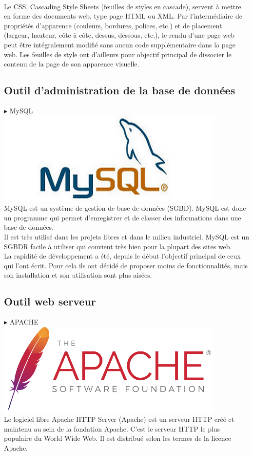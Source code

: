 \documentclass[a4paper, 12pt]{report}
\begin{document}
\\
\noindent Le CSS, Cascading Style Sheets (feuilles de styles en cascade), servent à mettre en forme des documents web, type page HTML ou XML. Par l’intermédiaire de propriétés d’apparence (couleurs, bordures, polices, etc.) et de placement (largeur, hauteur, côte à côte, dessus, dessous, etc.), le rendu d’une page web peut être intégralement modifié sans aucun code supplémentaire dans la page web. Les feuilles de style ont d’ailleurs pour objectif principal de dissocier le contenu de la page de son apparence visuelle.
\subsection{Outil d’administration de la base de données}
\noindent $\blacktriangleright$ MySQL
\\
\includegraphics{img/outils/6}
\\
\noindent MySQL est un système de gestion de base de données (SGBD). MySQL est donc un programme qui permet d'enregistrer et de classer des informations dans une base de données.
\\
Il est très utilisé dans les projets libres et dans le milieu industriel. MySQL est un SGBDR facile à utiliser qui convient très bien pour la plupart des sites web.
\\
La rapidité de développement a été, depuis le début l’objectif principal de ceux qui l’ont écrit. Pour cela ils ont décidé de proposer moins de fonctionnalités, mais son installation et son utilisation sont plus aisées.
\subsection{Outil web serveur}
\noindent $\blacktriangleright$ APACHE
\\
\includegraphics{img/outils/7}
\\
\noindent Le logiciel libre Apache HTTP Server (Apache) est un serveur HTTP créé et maintenu au sein de la fondation Apache. C'est le serveur HTTP le plus populaire du World Wide Web. Il est distribué selon les termes de la licence Apache.
\end{document}
